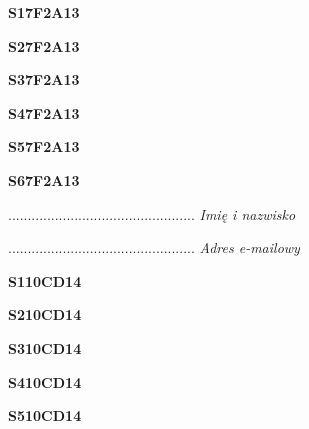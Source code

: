 \begin{turn}{90}\huge \textbf{S17F2A13}\end{turn}

\begin{turn}{90}\huge \textbf{S27F2A13}\end{turn}

\begin{turn}{90}\huge \textbf{S37F2A13}\end{turn}

\begin{turn}{90}\huge \textbf{S47F2A13}\end{turn}

\begin{turn}{90}\huge \textbf{S57F2A13}\end{turn}

\begin{turn}{90}\huge \textbf{S67F2A13}\end{turn}

\begin{turn}{90}\begin{minipage}{\linewidth} \vspace{20mm} ................................................  \textit{Imię i nazwisko}\end{minipage}\end{turn}

\begin{turn}{90}\begin{minipage}{\linewidth} \vspace{20mm} ................................................  \textit{Adres e-mailowy}\end{minipage}\end{turn}

\begin{turn}{90}\huge \textbf{S110CD14}\end{turn}

\begin{turn}{90}\huge \textbf{S210CD14}\end{turn}

\begin{turn}{90}\huge \textbf{S310CD14}\end{turn}

\begin{turn}{90}\huge \textbf{S410CD14}\end{turn}

\begin{turn}{90}\huge \textbf{S510CD14}\end{turn}

